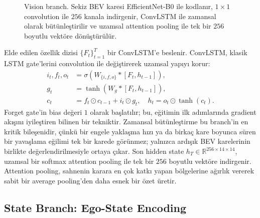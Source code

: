 \documentclass[conference]{IEEEtran}
\begin{document}
\begin{figure}[t]
\centering
{}
\caption{Vision branch. Sekiz BEV karesi EfficientNet-B0 ile kodlanır, $1\times1$ convolution ile $256$ kanala indirgenir, ConvLSTM ile zamansal olarak bütünleştirilir ve uzamsal attention pooling ile tek bir $256$ boyutlu vektöre dönüştürülür.}
\label{fig:vision}
\end{figure}

Elde edilen özellik dizisi $\{F_t\}_{t=1}^{T}$ bir ConvLSTM'e beslenir. ConvLSTM, klasik LSTM gate'lerini convolution ile değiştirerek uzamsal yapıyı korur:
\begin{align}
i_t,f_t,o_t &= \sigma(W_{\{i,f,o\}} * [F_t, h_{t-1}]), \\
g_t &= \tanh(W_g * [F_t, h_{t-1}]), \\
c_t &= f_t \odot c_{t-1} + i_t \odot g_t, \quad h_t = o_t \odot \tanh(c_t).
\end{align}
Forget gate'in bias değeri $1$ olarak başlatılır; bu, eğitimin ilk adımlarında gradient akışını iyileştiren bilinen bir tekniktir. Zamansal bütünleştirme bu branch'in en kritik bileşenidir, çünkü bir engele yaklaşma hızı ya da birkaç kare boyunca süren bir yavaşlama eğilimi tek bir karede görünmez; yalnızca ardışık BEV karelerinin birlikte değerlendirilmesiyle ortaya çıkar. Son hidden state $h_T \in \mathbb{R}^{256\times14\times14}$, uzamsal bir softmax attention pooling ile tek bir $256$ boyutlu vektöre indirgenir. Attention pooling, sahnenin karara en çok katkı yapan bölgelerine ağırlık vererek sabit bir average pooling'den daha esnek bir özet üretir.

\subsection{State Branch: Ego-State Encoding}
\end{document}
